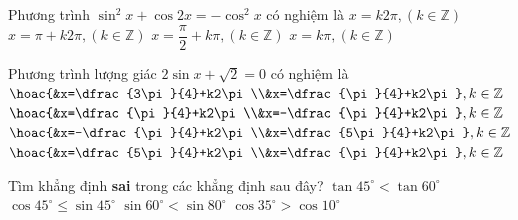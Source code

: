\begin{ex}%
	Phương trình $\sin^2  x+\cos 2x=-\cos^2 x$ có nghiệm là
	 \choice
		{$x=k2\pi, (k\in  \mathbb{Z})$}
		 {$x=\pi+k2\pi, (k\in \mathbb{Z})$}
		 {\True $x=\dfrac{\pi}{2}+k\pi, (k\in \mathbb{Z})$}
		 {$x=k\pi, (k\in \mathbb{Z})$}
\end{ex}

\begin{ex}%
	Phương trình lượng giác $2\sin  x+\sqrt{2}=0$ có nghiệm là
	 \choice
		{$\hoac{&x=\dfrac{3\pi}{4}+k2\pi\\&x=\dfrac{\pi}{4}+k2\pi},k\in \mathbb{Z}$} 
		{$\hoac{&x=\dfrac{\pi}{4}+k2\pi\\&x=-\dfrac{\pi}{4}+k2\pi},k\in  \mathbb{Z}$}
		 {\True $\hoac{&x=-\dfrac{\pi}{4}+k2\pi\\&x=\dfrac{5\pi}{4}+k2\pi},k\in \mathbb{Z}$}
		{$\hoac{&x=\dfrac{5\pi}{4}+k2\pi\\&x=\dfrac{\pi}{4}+k2\pi},k\in \mathbb{Z}$} 
\end{ex}

\begin{ex}%
	Tìm khẳng định {\bf sai} trong  các khẳng định sau đây?
	\choice 
		{$\tan 45^\circ <\tan 60^\circ  $}
		{$\cos 45^\circ\le\sin 45^\circ  $}
		{$\sin  60^\circ <\sin 80^\circ $}
		{\True $\cos 35^\circ  >\cos 10^\circ $}
\end{ex}

